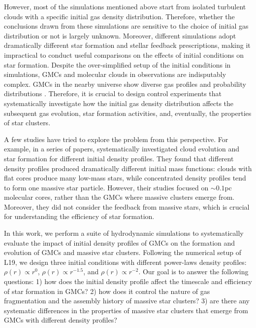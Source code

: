 \documentclass[fleqn,usenatbib]{mnras}
\begin{document}
However, most of the simulations mentioned above start from isolated turbulent clouds with a specific initial gas density distribution.
Therefore, whether the conclusions drawn from these simulations are sensitive to the choice of initial gas distribution or not is largely unknown.
Moreover, different simulations adopt dramatically different star formation and stellar feedback prescriptions, making it impractical to conduct useful comparisons on the effects of initial conditions on star formation.
Despite the over-simplified setup of the initial conditions in simulations, GMCs and molecular clouds in observations are indisputably complex. GMCs in the nearby universe show diverse gas profiles and probability distributions \citep{lombardi_2mass_2008, pirogov_density_2009, kainulainen_probing_2009, schneider_what_2013, schneider_understanding_2015, naranjo-romero_hierarchical_2015}.
Therefore, it is crucial to design control experiments that systematically investigate how the initial gas density distribution affects the subsequent gas evolution, star formation activities, and, eventually, the properties of star clusters.

A few studies have tried to explore the problem from this perspective.
For example, in a series of papers, \citet{girichidis_importance_2011, girichidis_importance_2012, girichidis_importance_2012-1} systematically investigated cloud evolution and star formation for different initial density profiles.
They found that different density profiles produced dramatically different initial mass functions: clouds with flat cores produce many low-mass stars, while concentrated density profiles tend to form one massive star particle.
However, their studies focused on $\sim0.1\mathrm{pc}$ molecular cores, rather than the GMCs where massive clusters emerge from.
Moreover, they did not consider the feedback from massive stars, which is crucial for understanding the efficiency of star formation.

In this work, we perform a suite of hydrodynamic simulations to systematically evaluate the impact of initial density profiles of GMCs on the formation and evolution of GMCs and massive star clusters. Following the numerical setup of L19, we design three initial conditions with different power-laws density profiles: $\rho(r)\propto r^0$, $\rho(r)\propto r^{-1.5}$, and $\rho(r)\propto r^{-2}$.
Our goal is to answer the following questions: 1) how does the initial density profile affect the timescale and efficiency of star formation in GMCs? 2) how does it control the nature of gas fragmentation and the assembly history of massive star clusters? 3) are there any systematic differences in the properties of massive star clusters that emerge from GMCs with different density profiles?
\end{document}
